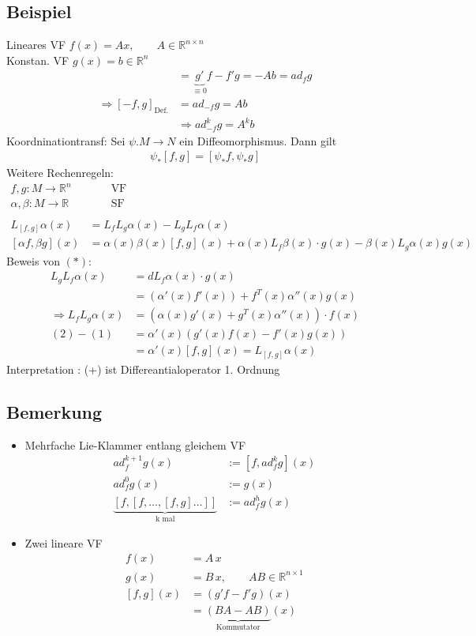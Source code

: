 \documentclass[ngerman]{tudscrreprt}
\begin{document}
\subsection*{Beispiel}
Lineares VF $f(x) = Ax,\qquad A\in \mathbb{R}^{n\times n}$\\
Konstan. VF $g(x) = b \in \mathbb{R}^n$
\begin{align*}
[f,g] &= \underbrace{g'}_{\equiv 0} f - f'g = -Ab = ad_f g\\ 
\Rightarrow [-f,g]_{\text{Def.}} &= ad_{-f}g = Ab\\ 
&\Rightarrow ad_{-f}^{k}g = A^k b
\end{align*}
Koordninationtransf: Sei $\psi. M \to N$ ein Diffeomorphismus. Dann gilt 
\begin{align*}
\psi_*[f,g] = [\psi_*f, \psi_* g]
\end{align*}
Weitere Rechenregeln: 
\begin{align*}
f,g : M\to \mathbb{R}^{n} &\qquad \text{VF}\\ 
\alpha, \beta: M\to \mathbb{R}&\qquad \text{SF}\\ 
&\\
L_{[f,g]} \alpha(x) &= L_f L_g \alpha(x) - L_gL_f\alpha(x)\\ 
[\alpha f,\beta g] (x) &= \alpha(x)\beta(x) [f,g](x) + \alpha(x)L_f\beta(x)\cdot g(x) - \beta(x)L_g \alpha(x)g(x)
\end{align*}
Beweis von $(*)$: 
\begin{align*}
L_g L_f\alpha(x) &= dL_f\alpha(x)\cdot g(x)\\ 
&= (\alpha'(x)f'(x) ) + f^T (x) \alpha'' (x) g(x) \tag{1}\\ 
\Rightarrow L_f L_g\alpha(x)&=(\alpha (x) g'(x) + g^T(x) \alpha'' (x) )\cdot f(x) \tag{2} \\ 
(2)-(1) &= \alpha'(x) (g'(x)f(x) - f'(x)g(x) )\\ 
&=\alpha'(x) [f,g] (x) = L_{[f,g]}\alpha(x)
\end{align*}
Interpretation : (+) ist Differeantialoperator 1. Ordnung
\subsection*{Bemerkung}
\begin{itemize}
\item Mehrfache Lie-Klammer entlang gleichem VF 
\begin{align*} 
ad_{f}^{k+1} g(x) &:= [f, ad_{f}^{k}g ] (x) \\
ad_{f}^{0}g(x) &:= g(x)\\ 
\underbrace{[f,[f,\dots,[f,g]\dots ]]}_{\text{k mal}} &:= ad_f^h g(x)
\end{align*}
\item Zwei lineare VF
\begin{align*}
f(x)&=A\,x\\ 
g(x)&=B\,x, \qquad A B \in \mathbb{R}^{n\times 1}\\ 
[f,g](x)&=(g'f - f'g)(x)\\ 
&=\underbrace{(BA - AB)}_{\text{Kommutator}}(x)
\end{align*}
\end{itemize}
\end{document}
